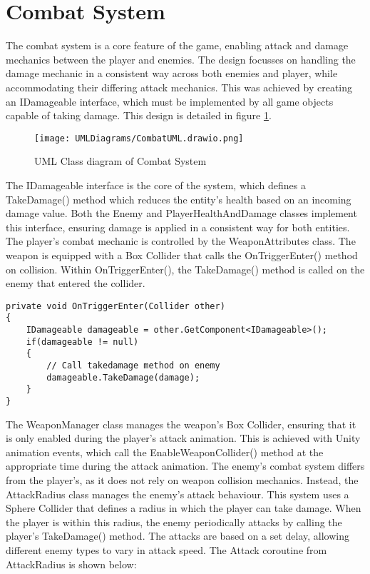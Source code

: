 \documentclass[10pt]{final_report}
\begin{document}
\section{Combat System}\label{combatsystem}
The combat system is a core feature of the game, enabling attack and damage mechanics between the player and enemies. The design focusses on handling the damage mechanic in a consistent way across both enemies and player, while accommodating their differing attack mechanics. This was achieved by creating an IDamageable interface, which must be implemented by all game objects capable of taking damage. This design is detailed in figure  \ref{fig:label_combat}.
\begin{figure}[H]
    \centering
    \texttt{[image: UMLDiagrams/CombatUML.drawio.png]}
    \caption{UML Class diagram of Combat System}
    \label{fig:label_combat}
\end{figure}
The IDamageable interface is the core of the system, which defines a TakeDamage() method which reduces the entity's health based on an incoming damage value. Both the Enemy and PlayerHealthAndDamage classes implement this interface, ensuring damage is applied in a consistent way for both entities. 
\newline The player's combat mechanic is controlled by the WeaponAttributes class. The weapon is equipped with a Box Collider that calls the OnTriggerEnter() method on collision. Within OnTriggerEnter(), the TakeDamage() method is called on the enemy that entered the collider. 
\begin{verbatim}
private void OnTriggerEnter(Collider other)
{
    IDamageable damageable = other.GetComponent<IDamageable>();
    if(damageable != null)
    {
        // Call takedamage method on enemy
        damageable.TakeDamage(damage);
    }
}
\end{verbatim}
The WeaponManager class manages the weapon's Box Collider, ensuring that it is only enabled during the player's attack animation. This is achieved with Unity animation events, which call the EnableWeaponCollider() method at the appropriate time during the attack animation.\newline 
The enemy's combat system differs from the player's, as it does not rely on weapon collision mechanics. Instead, the AttackRadius class manages the enemy's attack behaviour. This system uses a Sphere Collider that defines a radius in which the player can take damage. When the player is within this radius, the enemy periodically attacks by calling the player's TakeDamage() method. The  attacks are based on a set delay, allowing different enemy types to vary in attack speed. The Attack coroutine from AttackRadius is shown below:
\end{document}
